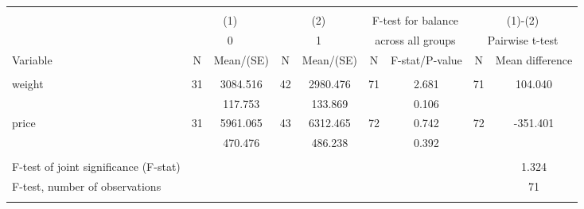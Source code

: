 \begin{tabular}{@{\extracolsep{5pt}}lcccccccc}
\\[-1.8ex]\hline \hline \\[-1.8ex]
 & \multicolumn{2}{c}{(1)}  & \multicolumn{2}{c}{(2)}  & \multicolumn{2}{c}{F-test for balance} & \multicolumn{2}{c}{(1)-(2)} \\
 & \multicolumn{2}{c}{0}  & \multicolumn{2}{c}{1}  & \multicolumn{2}{c}{across all groups} & \multicolumn{2}{c}{Pairwise t-test}  \\
Variable & N & Mean/(SE) & N & Mean/(SE) & N & F-stat/P-value & N & Mean difference \\ \hline \\[-1.8ex] 
weight   & 31    &  3084.516    & 42    &  2980.476    & 71    &     2.681    & 71    &   104.040   \\
 &   &   117.753  &   &   133.869  &   &     0.106  &   &   \\
price   & 31    &  5961.065    & 43    &  6312.465    & 72    &     0.742    & 72    &  -351.401   \\
 &   &   470.476  &   &   486.238  &   &     0.392  &   &   \\
\hline \\[-1.8ex]
F-test of joint significance (F-stat) & &   & &   & &     & &      1.324   \\
F-test, number of observations & &   & &   & &   & &  71   \\
\hline \\[-1.8ex]

\end{tabular}
